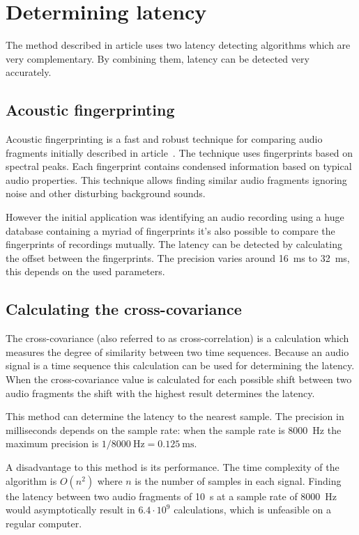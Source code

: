 \documentclass[twocolumn]{phdsymp} %
\begin{document}
\section{Determining latency}

The method described in article \cite{six2015multimodal} uses two latency detecting algorithms which are very complementary. By combining them, latency can be detected very accurately.

\subsection{Acoustic fingerprinting}
Acoustic fingerprinting is a fast and robust technique for comparing audio fragments initially described in article~\cite{Wang2003a}. The technique uses fingerprints based on spectral peaks. Each fingerprint contains condensed information based on typical audio properties. This technique allows finding similar audio fragments ignoring noise and other disturbing background sounds. 

However the initial application was identifying an audio recording using a huge database containing a myriad of fingerprints it's also possible to compare the fingerprints of recordings mutually. The latency can be detected by calculating the offset between the fingerprints. The precision varies around 16~ms to 32~ms, this depends on the used parameters.

\subsection{Calculating the cross-covariance}
The cross-covariance (also referred to as cross-correlation) is a calculation which measures the degree of similarity between two time sequences. Because an audio signal is a time sequence this calculation can be used for determining the latency. When the cross-covariance value is calculated for each possible shift between two audio fragments the shift with the highest result determines the latency.

This method can determine the latency to the nearest sample. The precision in milliseconds depends on the sample rate: when the sample rate is 8000~Hz the maximum precision is $ 1/8000~\textrm{Hz} = 0.125~\textrm{ms} $.

A disadvantage to this method is its performance. The time complexity of the algorithm is $ O(n^2) $ where $ n $ is the number of samples in each signal. Finding the latency between two audio fragments of 10~s at a sample rate of 8000~Hz would asymptotically result in $ 6.4 \cdot 10^9 $ calculations, which is unfeasible on a regular computer. 
\end{document}
